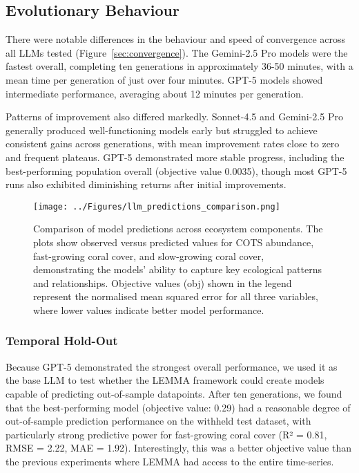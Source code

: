 \subsection{Evolutionary Behaviour}
There were notable differences in the behaviour and speed of convergence across all LLMs tested (Figure~\ref{sec:convergence}). The Gemini-2.5 Pro models were the fastest overall, completing ten generations in approximately 36-50 minutes, with a mean time per generation of just over four minutes. GPT-5 models showed intermediate performance, averaging about 12 minutes per generation.

Patterns of improvement also differed markedly. Sonnet-4.5 and Gemini-2.5 Pro generally produced well-functioning models early but struggled to achieve consistent gains across generations, with mean improvement rates close to zero and frequent plateaus. GPT-5 demonstrated more stable progress, including the best-performing population overall (objective value 0.0035), though most GPT-5 runs also exhibited diminishing returns after initial improvements.

\begin{figure}[H]
    \centering
    \texttt{[image: ../Figures/llm\_predictions\_comparison.png]}
    \caption{Comparison of model predictions across ecosystem components. The plots show observed versus predicted values for COTS abundance, fast-growing coral cover, and slow-growing coral cover, demonstrating the models' ability to capture key ecological patterns and relationships. Objective values (obj) shown in the legend represent the normalised mean squared error for all three variables, where lower values indicate better model performance.}
    \label{fig:llm_comparison}
\end{figure}
    

\subsubsection{Temporal Hold-Out}

Because GPT-5 demonstrated the strongest overall performance, we used it as the base LLM to test whether the LEMMA framework could create models capable of predicting out-of-sample datapoints. After ten generations, we found that the best-performing model (objective value: 0.29) had a reasonable degree of out-of-sample prediction performance on the withheld test dataset, with particularly strong predictive power for fast-growing coral cover (R² = 0.81, RMSE = 2.22, MAE = 1.92). Interestingly, this was a better objective value than the previous experiments where LEMMA had access to the entire time-series.


